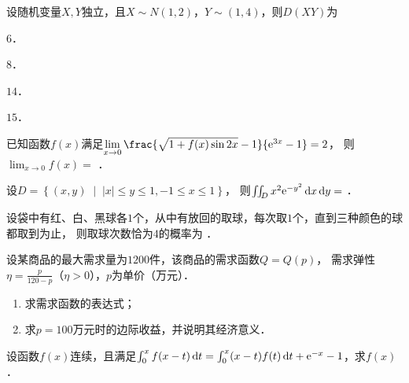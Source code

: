 \documentclass[plain,noanswer,medmath]{../../template/jnuexam}
\begin{document}
\begin{problem}
设随机变量$X,Y$独立，且$X\sim N(1,2)$，$Y\sim (1,4)$，则$D(XY)$为\pickout{}
\begin{abcd}
\item $6$．
\item $8$．
\item $14$．
\item $15$．
\end{abcd}
\end{problem}




\begin{problem}
已知函数$f(x)$满足$\lim_{x \to 0} \frac{\sqrt{1 + f(x)\sin 2x} - 1}{\e^{3x} - 1} = 2$，
则$\lim_{x \to 0} f(x) =$ \fillin{}．
\end{problem}






\begin{problem}
设$D = \left\{(x,y)\;\middle|\;|x| \le y \le 1, - 1 \le x \le 1 \right\}$，
则$\iint_D x^2\mathrm{e}^{- y^2} \mathop{}\!\mathrm{d} x\mathop{}\!\mathrm{d} y =$ \fillin{}．
\end{problem}




\begin{problem}
设袋中有红、白、黑球各$1$个，从中有放回的取球，每次取$1$个，直到三种颜色的球都取到为止，
则取球次数恰为$4$的概率为 \fillin{}．
\end{problem}






\begin{problem}[points=10]
设某商品的最大需求量为$1200$件，该商品的需求函数$Q = Q(p)$，
需求弹性$\eta = \frac{p}{120 - p}$（$\eta > 0$），$p$为单价（万元）．
\begin{enumerate}
\item 求需求函数的表达式；
\item 求$p = 100$万元时的边际收益，并说明其经济意义．
\end{enumerate}
\end{problem}




\begin{problem}[points=10]
设函数$f(x)$连续，且满足$\int_0^x f(x - t) \mathop{}\!\mathrm{d} t = \int_0^x (x - t)f(t)\mathop{}\!\mathrm{d} t + \mathrm{e}^{- x} - 1$，求$f(x)$．
\end{problem}
\end{document}
